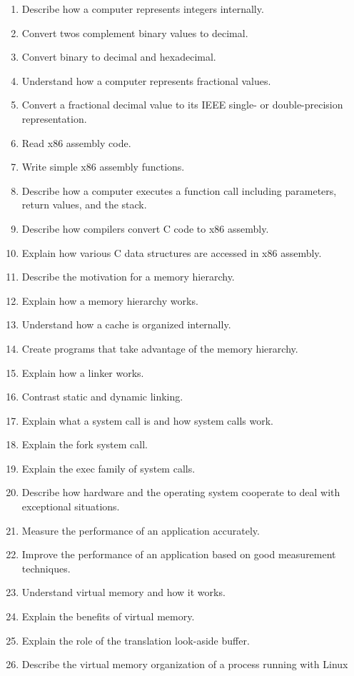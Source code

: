 \documentclass[11pt]{article}
\begin{document}
\begin{enumerate}
\item Describe how a computer represents integers internally.
\item Convert twos complement binary values to decimal.
\item Convert binary to decimal and hexadecimal.
\item Understand how a computer represents fractional values.
\item Convert a fractional decimal value to its IEEE single- or
  double-precision representation.
\item Read x86 assembly code.
\item Write simple x86 assembly functions.
\item Describe how a computer executes a function call including parameters,
  return values, and the stack.
\item Describe how compilers convert C code to x86 assembly.
\item Explain how various C data structures are accessed in x86 assembly.
\item Describe the motivation for a memory hierarchy.
\item Explain how a memory hierarchy works.
\item Understand how a cache is organized internally.
\item Create programs that take advantage of the memory hierarchy.
\item Explain how a linker works.
\item Contrast static and dynamic linking.
\item Explain what a system call is and how system calls work.
\item Explain the fork system call.
\item Explain the exec family of system calls.
\item Describe how hardware and the operating system cooperate to deal with
  exceptional situations.
\item Measure the performance of an application accurately.
\item Improve the performance of an application based on good measurement
  techniques.
\item Understand virtual memory and how it works.
\item Explain the benefits of virtual memory.
\item Explain the role of the translation look-aside buffer.
\item Describe the virtual memory organization of a process running with Linux

\end{enumerate}
\end{document}
